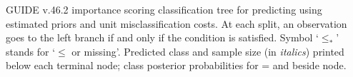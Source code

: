\documentclass[12pt]{article}
\begin{document}
 \begin{center} \footnotesize
{}
 \end{center}
GUIDE v.46.2 importance scoring
classification tree for predicting \texttt{} using
estimated priors
and unit misclassification costs.
At each split, an observation goes to the left branch 
 if and only if the condition is satisfied.
 Symbol `$\leq_*$' stands for `$\leq$ or missing'.
Predicted class and sample size (in \emph{italics}) printed below each terminal node;
class posterior probabilities for \texttt{} =
 \texttt{} and \texttt{} beside node.
 
\end{document}
